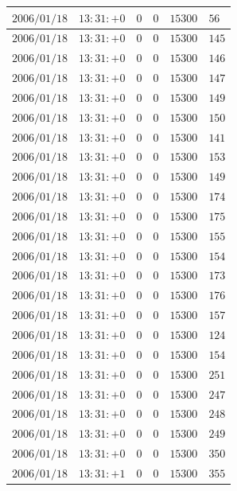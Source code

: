 \documentclass[a4j,papersize,disablejfam,slide,14pt]{jsarticle}
\begin{document}
\begin{description}
\begin{center}
\begin{longtable}{|l|l|l|l|l|l|}
					$2006/01/18$ & $13:31:+0$  & $0$ & $0$ & $15300$ & $56$ \\ \hline
					$2006/01/18$ & $13:31:+0$  & $0$ & $0$ & $15300$ & $145$ \\ \hline
					$2006/01/18$ & $13:31:+0$  & $0$ & $0$ & $15300$ & $146$ \\ \hline
					$2006/01/18$ & $13:31:+0$  & $0$ & $0$ & $15300$ & $147$ \\ \hline
					$2006/01/18$ & $13:31:+0$  & $0$ & $0$ & $15300$ & $149$ \\ \hline
					$2006/01/18$ & $13:31:+0$  & $0$ & $0$ & $15300$ & $150$ \\ \hline
					$2006/01/18$ & $13:31:+0$  & $0$ & $0$ & $15300$ & $141$ \\ \hline
					$2006/01/18$ & $13:31:+0$  & $0$ & $0$ & $15300$ & $153$ \\ \hline
					$2006/01/18$ & $13:31:+0$  & $0$ & $0$ & $15300$ & $149$ \\ \hline
					$2006/01/18$ & $13:31:+0$  & $0$ & $0$ & $15300$ & $174$ \\ \hline
					$2006/01/18$ & $13:31:+0$  & $0$ & $0$ & $15300$ & $175$ \\ \hline
					$2006/01/18$ & $13:31:+0$  & $0$ & $0$ & $15300$ & $155$ \\ \hline
					$2006/01/18$ & $13:31:+0$  & $0$ & $0$ & $15300$ & $154$ \\ \hline
					$2006/01/18$ & $13:31:+0$  & $0$ & $0$ & $15300$ & $173$ \\ \hline
					$2006/01/18$ & $13:31:+0$  & $0$ & $0$ & $15300$ & $176$ \\ \hline
					$2006/01/18$ & $13:31:+0$  & $0$ & $0$ & $15300$ & $157$ \\ \hline
					$2006/01/18$ & $13:31:+0$  & $0$ & $0$ & $15300$ & $124$ \\ \hline
					$2006/01/18$ & $13:31:+0$  & $0$ & $0$ & $15300$ & $154$ \\ \hline
					$2006/01/18$ & $13:31:+0$  & $0$ & $0$ & $15300$ & $251$ \\ \hline
					$2006/01/18$ & $13:31:+0$  & $0$ & $0$ & $15300$ & $247$ \\ \hline
					$2006/01/18$ & $13:31:+0$  & $0$ & $0$ & $15300$ & $248$ \\ \hline
					$2006/01/18$ & $13:31:+0$  & $0$ & $0$ & $15300$ & $249$ \\ \hline
					$2006/01/18$ & $13:31:+0$  & $0$ & $0$ & $15300$ & $350$ \\ \hline
					$2006/01/18$ & $13:31:+1$  & $0$ & $0$ & $15300$ & $355$ \\ \hline

\end{longtable}
\end{center}
\end{description}
\end{document}

